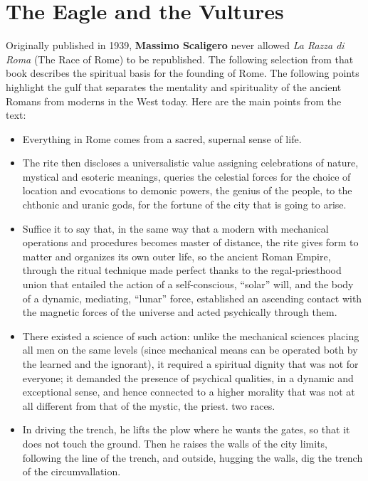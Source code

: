 \section{The Eagle and the Vultures}

Originally published in 1939, \textbf{Massimo Scaligero} never allowed \emph{La Razza di Roma} (The Race of Rome) to be republished. The following selection from that book describes the spiritual basis for the founding of Rome. The following points highlight the gulf that separates the mentality and spirituality of the ancient Romans from moderns in the West today. Here are the main points from the text:

\begin{itemize}


\item Everything in Rome comes from a sacred, supernal sense of life.

\item The rite then discloses a universalistic value assigning celebrations of nature, mystical and esoteric meanings, queries the celestial forces for the choice of location and evocations to demonic powers, the genius of the people, to the chthonic and uranic gods, for the fortune of the city that is going to arise.

\item Suffice it to say that, in the same way that a modern with mechanical operations and procedures becomes master of distance, the rite gives form to matter and organizes its own outer life, so the ancient Roman Empire, through the ritual technique made perfect thanks to the regal-priesthood union that entailed the action of a self-conscious, ``solar'' will, and the body of a dynamic, mediating, ``lunar'' force, established an ascending contact with the magnetic forces of the universe and acted psychically through them.

\item There existed a science of such action: unlike the mechanical sciences placing all men on the same levels (since mechanical means can be operated both by the learned and the ignorant), it required a spiritual dignity that was not for everyone; it demanded the presence of psychical qualities, in a dynamic and exceptional sense, and hence connected to a higher morality that was not at all different from that of the mystic, the priest. two races.

\item In driving the trench, he lifts the plow where he wants the gates, so that it does not touch the ground. Then he raises the walls of the city limits, following the line of the trench, and outside, hugging the walls, dig the trench of the circumvallation.


\end{itemize}
